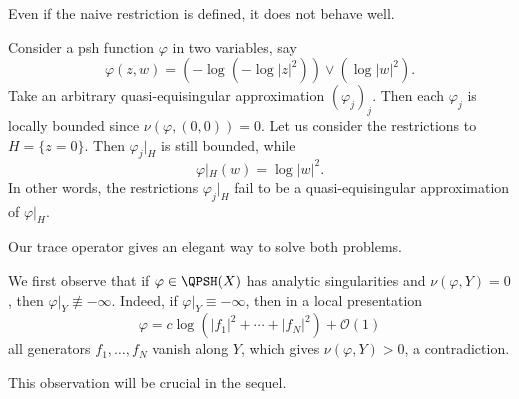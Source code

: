 Even if the naive restriction is defined, it does not behave well.
\begin{example}\label{ex:naive_res2}
    Consider a psh function $\varphi$ in two variables, say
    \[
    \varphi(z,w)=\left( -\log (-\log |z|^2)\right) \lor \left(\log |w|^2\right).
    \]
    Take an arbitrary quasi-equisingular approximation $(\varphi_j)_j$. Then each $\varphi_j$ is locally bounded since $\nu(\varphi,(0,0))=0$. Let us consider the restrictions to $H=\{z=0\}$. Then $\varphi_j|_H$ is still bounded, while
    \[
    \varphi|_H(w)=\log |w|^2.
    \]
    In other words, the restrictions $\varphi_j|_H$ fail to be a quasi-equisingular approximation of $\varphi|_H$.
\end{example}
Our trace operator gives an elegant way to solve both problems.

We first observe that if $\varphi\in \QPSH(X)$ has analytic singularities and $\nu(\varphi,Y)=0$, then $\varphi|_Y\not\equiv -\infty$.
Indeed, if $\varphi|_Y\equiv-\infty$, then in a local presentation
\[
    \varphi=c\log(|f_1|^2+\cdots+|f_N|^2)+\mathcal{O}(1)
\]
all generators $f_1,\ldots,f_N$ vanish along $Y$, which gives $\nu(\varphi,Y)>0$, a contradiction.

This observation will be crucial in the sequel.

